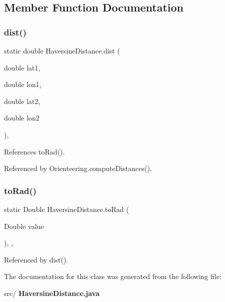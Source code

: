 \subsection{Member Function Documentation}
\mbox{\label{classHaversineDistance_a93a454b822cbfcc6ffd9471c07c455a9}} 
\subsubsection{dist()}
{\footnotesize\ttfamily static double Haversine\+Distance.\+dist (\begin{DoxyParamCaption}\item[{double}]{lat1,  }\item[{double}]{lon1,  }\item[{double}]{lat2,  }\item[{double}]{lon2 }\end{DoxyParamCaption})\hspace{0.3cm}{\ttfamily [inline]}, {\ttfamily [static]}}



References to\+Rad().



Referenced by Orienteering.\+compute\+Distances().

\mbox{\label{classHaversineDistance_a0365466d45f539775d9c6251d7aabbcf}} 
\subsubsection{to\+Rad()}
{\footnotesize\ttfamily static Double Haversine\+Distance.\+to\+Rad (\begin{DoxyParamCaption}\item[{Double}]{value }\end{DoxyParamCaption})\hspace{0.3cm}{\ttfamily [inline]}, {\ttfamily [static]}, {\ttfamily [private]}}



Referenced by dist().



The documentation for this class was generated from the following file\+:\begin{DoxyCompactItemize}
\item 
src/\textbf{ Haversine\+Distance.\+java}\end{DoxyCompactItemize}
